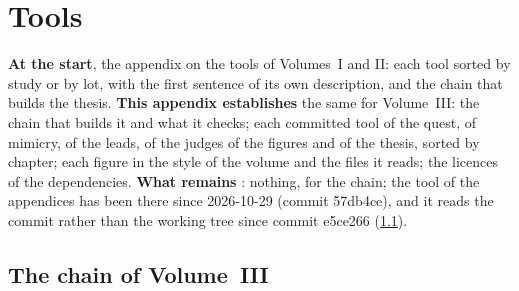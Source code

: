 
\chapter{Tools}\label{t3ann:outils}

\begin{origine}
\textbf{At the start}, the appendix on the tools of Volumes~I and II: each tool sorted by study or by lot, with the first sentence of its own description, and the chain that builds the thesis.
\textbf{This appendix establishes} the same for Volume~III: the chain that builds it and what it checks; each committed tool of the quest, of mimicry, of the leads, of the judges of the figures and of the thesis, sorted by chapter; each figure in the style of the volume and the files it reads; the licences of the dependencies.
\textbf{What remains} : nothing, for the chain; the tool of the appendices has been there since 2026-10-29 (commit 57db4ce), and it reads the commit rather than the working tree since commit e5ce266 (\cref{t3ann:sec:chaine}).
\end{origine}

\section{The chain of Volume~III}\label{t3ann:sec:chaine}

